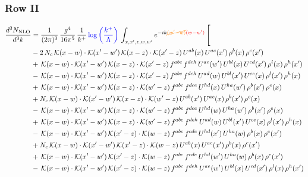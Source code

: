 \documentclass[9pt]{article}
\numberwithin{equation}{section}
\begin{document}
\subsubsection{Row II}
\begin{align}
\frac{d^{3}N_{\mathrm{NLO}}}{d^{3}k} & = \frac{1}{(2\pi)^{3}}\,\frac{g^{4}}{16\pi^{5}}\,\frac{1}{k^{+}}\,{\color{blue}\log{\left(\frac{k^{+}}{\Lambda}\right)}}\,\int_{x,x',z,w,w'}e^{-ik{\color{orange}\cancel{(w'-w)}}{\color{red}(w-w')}}\,\Bigg[\notag\\ &  -2\,N_{c}\,\mathcal{K}(x-w)\cdot\mathcal{K}(x'-w')\,\mathcal{K}(x-z)\cdot\mathcal{K}(x'-z)\,U^{ab}(x)\,U^{ac}(x')\,\rho^{b}(x)\,\rho^{c}(x')\notag\\
& +\,\mathcal{K}(x-w)\cdot\mathcal{K}(x'-w')\,\mathcal{K}(x-z)\cdot\mathcal{K}(x'-z)\,f^{abc}\,f^{deh}\,U^{ae}(w')\,U^{bl}(x)\,U^{cd}(x')\,\rho^{l}(x)\,\rho^{h}(x')\notag\\
& -\,\mathcal{K}(x-w)\cdot\mathcal{K}(x'-w')\,\mathcal{K}(x-z)\cdot\mathcal{K}(x'-z)\,f^{abc}\,f^{deh}\,U^{ad}(w)\,U^{bl}(x')\,U^{ce}(x)\,\rho^{l}(x')\,\rho^{h}(x)\notag\\
& +\,\mathcal{K}(x-w)\cdot\mathcal{K}(x'-w')\,\mathcal{K}(x-z)\cdot\mathcal{K}(w'-z)\,f^{abc}\,f^{dce}\,U^{hd}(x)\,U^{ha}(w')\,\rho^{b}(x')\,\rho^{e}(x)\notag\\
& +N_{c}\,\mathcal{K}(x-w)\cdot\mathcal{K}(x'-w')\,\mathcal{K}(x-z)\cdot\mathcal{K}(w'-z)\,U^{ab}(x')\,U^{ac}(x)\,\rho^{b}(x')\,\rho^{c}(x)\notag\\
& -\,\mathcal{K}(x-w)\cdot\mathcal{K}(x'-w')\,\mathcal{K}(x-z)\cdot\mathcal{K}(w'-z)\,f^{abc}\,f^{dce}\,U^{hd}(w)\,U^{ha}(w')\,\rho^{b}(x')\,\rho^{e}(x)\notag\\
& +\,\mathcal{K}(x-w)\cdot\mathcal{K}(x'-w')\,\mathcal{K}(x-z)\cdot\mathcal{K}(w'-z)\,f^{abc}\,f^{deh}\,U^{ad}(w)\,U^{bl}(x')\,U^{ce}(x)\,\rho^{l}(x')\,\rho^{h}(x)\notag\\
& -\,\mathcal{K}(x-w)\cdot\mathcal{K}(x'-w')\,\mathcal{K}(x'-z)\cdot\mathcal{K}(w-z)\,f^{abc}\,f^{cde}\,U^{hd}(x')\,U^{ha}(w)\,\rho^{b}(x)\,\rho^{e}(x')\notag\\
& +N_{c}\,\mathcal{K}(x-w)\cdot\mathcal{K}(x'-w')\,\mathcal{K}(x'-z)\cdot\mathcal{K}(w-z)\,U^{ab}(x)\,U^{ac}(x')\,\rho^{b}(x)\,\rho^{c}(x')\notag\\
& +\,\mathcal{K}(x-w)\cdot\mathcal{K}(x'-w')\,\mathcal{K}(x'-z)\cdot\mathcal{K}(w-z)\,f^{abc}\,f^{cde}\,U^{hd}(w')\,U^{ha}(w)\,\rho^{b}(x)\,\rho^{e}(x')\notag\\
& -\,\mathcal{K}(x-w)\cdot\mathcal{K}(x'-w')\,\mathcal{K}(x'-z)\cdot\mathcal{K}(w-z)\,f^{abc}\,f^{deh}\,U^{ae}(w')\,U^{bl}(x)\,U^{cd}(x')\,\rho^{l}(x)\,\rho^{h}(x')\notag\\

\end{align}
\end{document}
